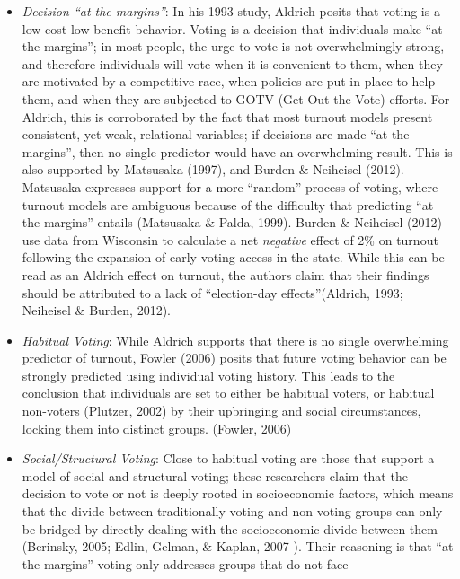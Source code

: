 \documentclass[12pt,twoside]{reedthesis}
\begin{document}
  \begin{itemize}
  \item
    \emph{Decision ``at the margins''}: In his 1993 study, Aldrich posits
    that voting is a low cost-low benefit behavior. Voting is a decision
    that individuals make ``at the margins''; in most people, the urge to
    vote is not overwhelmingly strong, and therefore individuals will vote
    when it is convenient to them, when they are motivated by a
    competitive race, when policies are put in place to help them, and
    when they are subjected to GOTV (Get-Out-the-Vote) efforts. For
    Aldrich, this is corroborated by the fact that most turnout models
    present consistent, yet weak, relational variables; if decisions are
    made ``at the margins'', then no single predictor would have an
    overwhelming result. This is also supported by Matsusaka (1997), and
    Burden \& Neiheisel (2012). Matsusaka expresses support for a more
    ``random'' process of voting, where turnout models are ambiguous
    because of the difficulty that predicting ``at the margins'' entails
    (Matsusaka \& Palda, 1999). Burden \& Neiheisel (2012) use data from
    Wisconsin to calculate a net \emph{negative} effect of 2\% on turnout
    following the expansion of early voting access in the state. While
    this can be read as an Aldrich effect on turnout, the authors claim
    that their findings should be attributed to a lack of ``election-day
    effects''(Aldrich, 1993; Neiheisel \& Burden, 2012).
  \item
    \emph{Habitual Voting}: While Aldrich supports that there is no single
    overwhelming predictor of turnout, Fowler (2006) posits that future
    voting behavior can be strongly predicted using individual voting
    history. This leads to the conclusion that individuals are set to
    either be habitual voters, or habitual non-voters (Plutzer, 2002) by
    their upbringing and social circumstances, locking them into distinct
    groups. (Fowler, 2006)
  \item
    \emph{Social/Structural Voting}: Close to habitual voting are those
    that support a model of social and structural voting; these
    researchers claim that the decision to vote or not is deeply rooted in
    socioeconomic factors, which means that the divide between
    traditionally voting and non-voting groups can only be bridged by
    directly dealing with the socioeconomic divide between them (Berinsky,
    2005; Edlin, Gelman, \& Kaplan, 2007 ). Their reasoning is that ``at
    the margins'' voting only addresses groups that do not face

\end{itemize}
\end{document}
